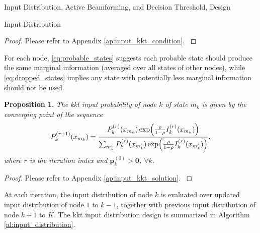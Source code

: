 \documentclass[journal]{IEEEtran}
\newtheorem{proposition}{Proposition}
\begin{document}
\begin{section}{Input Distribution, Active Beamforming, and Decision Threshold, Design}
\begin{subsection}{Input Distribution}
		\begin{proof}
			Please refer to Appendix \ref{ap:input_kkt_condition}.
			\label{pf:input_kkt_condition}
		\end{proof}

		For each node, \eqref{eq:probable_states} suggests each probable state should produce the same marginal information (averaged over all states of other nodes), while \eqref{eq:dropped_states} implies any state with potentially less marginal information should not be used.
		\begin{proposition}
			The \gls{kkt} input probability of node $k$ of state $m_k$ is given by the converging point of the sequence
			\begin{equation}
				P_k^{(r+1)}(x_{m_k}) = \frac{P_k^{(r)}(x_{m_k}) \exp \Bigl( \frac{\rho}{1 - \rho} I_k^{(r)}(x_{m_k}) \Bigr)}{\sum_{m_k'} P_k^{(r)}(x_{m_k'}) \exp \Bigl( \frac{\rho}{1 - \rho} I_k^{(r)}(x_{m_k'}) \Bigr)},
				\label{eq:input_kkt_solution}
			\end{equation}
			where $r$ is the iteration index and $\boldsymbol{p}_k^{(0)} > \boldsymbol{0}$, $\forall k$.
			\label{pr:input_kkt_solution}
		\end{proposition}
		\begin{proof}
			Please refer to Appendix \ref{ap:input_kkt_solution}.
			\label{pf:input_kkt_solution}
		\end{proof}

		At each iteration, the input distribution of node $k$ is evaluated over updated input distribution of node $1$ to $k-1$, together with previous input distribution of node $k+1$ to $K$. The \gls{kkt} input distribution design is summarized in Algorithm \ref{al:input_distribution}.


\end{subsection}
\end{section}
\end{document}
